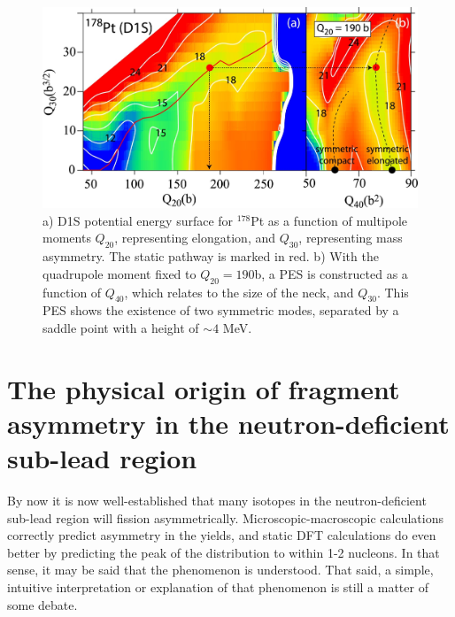 \begin{figure}
	\centering
	\includegraphics[width=0.7\linewidth]{TeX_files/178Pt_D1S_pes.jpg}
	\caption[a) D1S potential energy surface for $^{178}$Pt as a function of multipole moments $Q_{20}$, representing elongation, and $Q_{30}$, representing mass asymmetry. The static pathway is marked in red. b) With the quadrupole moment fixed to $Q_{20}=190$b, a PES is constructed as a function of $Q_{40}$, which relates to the size of the neck, and $Q_{30}$. This PES shows the existence of two symmetric modes, separated by a saddle point with a height of ${\sim}4$ MeV.]{a) D1S potential energy surface for $^{178}$Pt as a function of multipole moments $Q_{20}$, representing elongation, and $Q_{30}$, representing mass asymmetry. The static pathway is marked in red. b) With the quadrupole moment fixed to $Q_{20}=190$b, a PES is constructed as a function of $Q_{40}$, which relates to the size of the neck, and $Q_{30}$. This PES shows the existence of two symmetric modes, separated by a saddle point with a height of ${\sim}4$ MeV.}
	\label{fig:178ptd1spes}
\end{figure}



\section{The physical origin of fragment asymmetry in the neutron-deficient sub-lead region}

By now it is now well-established that many isotopes in the neutron-deficient sub-lead region will fission asymmetrically. Microscopic-macroscopic calculations correctly predict asymmetry in the yields, and static DFT calculations do even better by predicting the peak of the distribution to within 1-2 nucleons. In that sense, it may be said that the phenomenon is understood. That said, a simple, intuitive interpretation or explanation of that phenomenon is still a matter of some debate.

